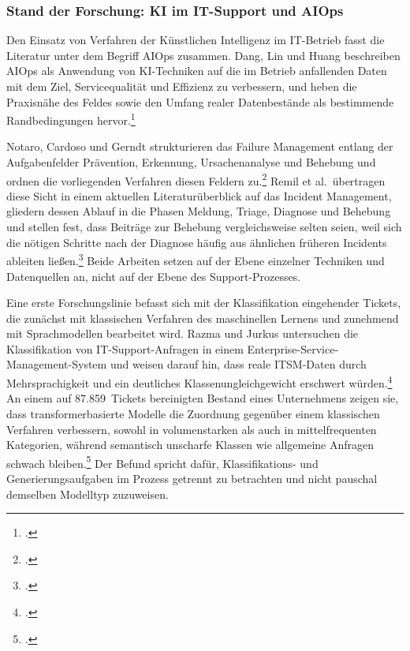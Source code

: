\subsubsection{Stand der Forschung: KI im IT-Support und AIOps}
\label{aiopsStand}

Den Einsatz von Verfahren der K\"unstlichen Intelligenz im IT-Betrieb fasst die Literatur unter dem Begriff AIOps zusammen. Dang, Lin und Huang beschreiben AIOps als Anwendung von KI-Techniken auf die im Betrieb anfallenden Daten mit dem Ziel, Servicequalit\"at und Effizienz zu verbessern, und heben die Praxisn\"ahe des Feldes sowie den Umfang realer Datenbest\"ande als bestimmende Randbedingungen hervor.\footcite[Vgl.][hier S.~4]{DangLinHuang2019}

Notaro, Cardoso und Gerndt strukturieren das Failure Management entlang der Aufgabenfelder Pr\"avention, Erkennung, Ursachenanalyse und Behebung und ordnen die vorliegenden Verfahren diesen Feldern zu.\footcite[Vgl.][hier S.~7]{Notaro2021} Remil et al.~\"ubertragen diese Sicht in einem aktuellen Literatur\"uberblick auf das Incident Management, gliedern dessen Ablauf in die Phasen Meldung, Triage, Diagnose und Behebung und stellen fest, dass Beitr\"age zur Behebung vergleichsweise selten seien, weil sich die n\"otigen Schritte nach der Diagnose h\"aufig aus \"ahnlichen fr\"uheren Incidents ableiten lie{\ss}en.\footcite[Vgl.][S.~16 und 19]{Remil2024} Beide Arbeiten setzen auf der Ebene einzelner Techniken und Datenquellen an, nicht auf der Ebene des Support-Prozesses.

Eine erste Forschungslinie befasst sich mit der Klassifikation eingehender Tickets, die zun\"achst mit klassischen Verfahren des maschinellen Lernens und zunehmend mit Sprachmodellen bearbeitet wird. Razma und Jurkus untersuchen die Klassifikation von IT-Support-Anfragen in einem Enterprise-Service-Management-System und weisen darauf hin, dass reale ITSM-Daten durch Mehrsprachigkeit und ein deutliches Klassenungleichgewicht erschwert w\"urden.\footcite[Vgl.][S.~1]{RazmaJurkus2026} An einem auf 87.859~Tickets bereinigten Bestand eines Unternehmens zeigen sie, dass transformerbasierte Modelle die Zuordnung gegen\"uber einem klassischen Verfahren verbessern, sowohl in volumenstarken als auch in mittelfrequenten Kategorien, w\"ahrend semantisch unscharfe Klassen wie allgemeine Anfragen schwach bleiben.\footcite[Vgl.][S.~12 und 27]{RazmaJurkus2026} Der Befund spricht daf\"ur, Klassifikations- und Generierungsaufgaben im Prozess getrennt zu betrachten und nicht pauschal demselben Modelltyp zuzuweisen.

